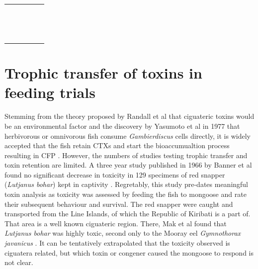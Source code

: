 \documentclass[12pt]{article}
\begin{document}
\begin{longtable}{  p{2cm} p{3cm}  p{4.5cm}  p{2cm}  p{3cm}  }
  & \emph{} &  &  & \\
  &  \emph{} &  &  & \\
  & \emph{}  &  &  & \\
  & \emph{} &  &  & \\
  &  \emph{} &  &  & \\
  & \emph{}  &  &  & \\
  & \emph{} &  &  & \\
  &  \emph{} &  &  & \\
  & \emph{}  &  &  & \\
  & \emph{} &  &  & \\
  &  \emph{} &  &  & \\
  & \emph{}  &  &  & \\
  & \emph{} &  &  & \\
\end{longtable}

\FloatBarrier

\section{Trophic transfer of toxins in feeding trials}

Stemming from the theory proposed by Randall et al that ciguateric toxins would be an environmental factor and the discovery by Yasumoto et al in 1977 that herbivorous or omnivorous fish consume \emph{Gambierdiscus} cells directly, it is widely accepted that the fish retain CTXs and start the bioaccumualtion process resulting in CFP \cite{randall1958review,yasumoto1977finding}.
However, the numbers of studies testing trophic transfer and toxin retention are limited.
A three year study published in 1966 by Banner et al found no significant decrease in toxicity in 129 specimens of red snapper (\emph{Lutjanus bohar}) kept in captivity \cite{banner1966retention}. Regretably, this study pre-dates meaningful toxin analysis as toxicity was assessed by feeding the fish to mongoose and rate their subsequent behaviour and survival. The red snapper were caught and transported from the Line Islands, of which the Republic of Kiribati is a part of. That area is a well known ciguateric region. There, Mak et al found that \emph{Lutjanus bohar} was highly toxic, second only to the Mooray eel \emph{Gymnothorax javanicus} \cite{mak2013pacific}. It can be tentatively extrapolated that the toxicity observed is ciguatera related, but which toxin or congener caused the mongoose to respond is not clear.
\end{document}
